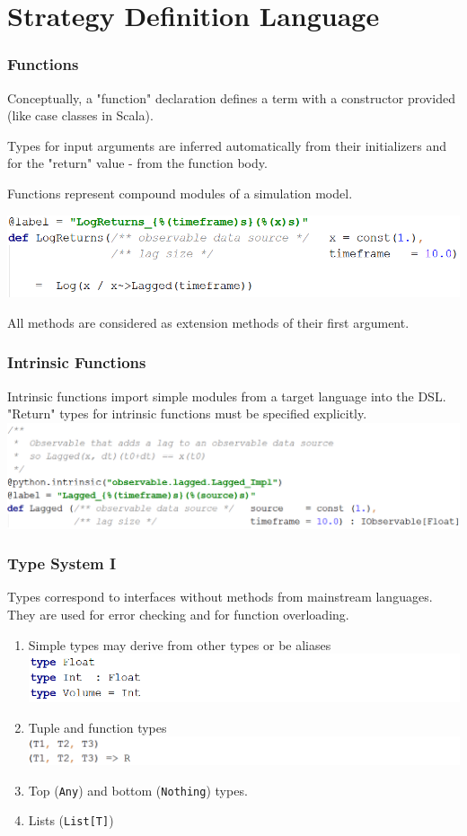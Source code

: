 \documentclass{beamer}
\begin{document}
\section{Strategy Definition Language}
\begin{frame}
\frametitle{Functions}
Conceptually, a "function" declaration defines a term with a constructor provided (like case classes in Scala). 

Types for input arguments are inferred automatically from their initializers and for the "return" value - from the function body.

Functions represent compound modules of a simulation model.

\includegraphics[width=1\linewidth]{logreturns.png}

All methods are considered as extension methods of their first argument.
\end{frame}
\begin{frame}
\frametitle{Intrinsic Functions}
Intrinsic functions import simple modules from a target language into the DSL. 
"Return" types for intrinsic functions must be specified explicitly.
\includegraphics[width=1\linewidth]{lagged.png}
\end{frame}
\begin{frame}
\frametitle{Type System I}
Types correspond to interfaces without methods from mainstream languages. They are used for error checking and for function overloading.
\begin{enumerate}
  \item Simple types may derive from other types or be aliases
  \includegraphics[width=1\linewidth]{intfloat.png}
  \item Tuple and function types
  \includegraphics[width=1\linewidth]{tuplefunction.png}
  \item Top (\texttt{Any}) and bottom (\texttt{Nothing}) types.
  \item Lists (\texttt{List[T]})
\end{enumerate}
\end{frame}
\end{document}

